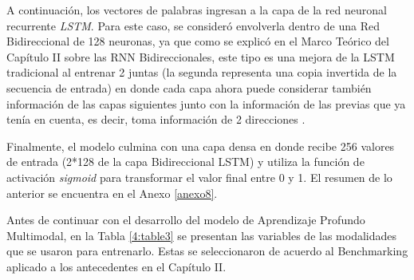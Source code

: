 A continuación, los vectores de palabras ingresan a la capa de la red neuronal recurrente \textit{LSTM}. Para este caso, se consideró envolverla dentro de una Red Bidireccional de 128 neuronas, ya que como se explicó en el Marco Teórico del Capítulo II sobre las RNN Bidireccionales, este tipo es una mejora de la LSTM tradicional al entrenar 2 juntas (la segunda representa una copia invertida de la secuencia de entrada) en donde cada capa ahora puede considerar también información de las capas siguientes junto con la información de las previas que ya tenía en cuenta, es decir, toma información de 2 direcciones \parencite{tec_brownlee2017bidirectional_lstm}.

Finalmente, el modelo culmina con una capa densa en donde recibe 256 valores de entrada (2*128 de la capa Bidireccional LSTM) y utiliza la función de activación \textit{sigmoid} para transformar el valor final entre 0 y 1. El resumen de lo anterior se encuentra en el Anexo \ref{anexo8}.

Antes de continuar con el desarrollo del modelo de Aprendizaje Profundo Multimodal, en la Tabla \ref{4:table3} se presentan las variables de las modalidades que se usaron para entrenarlo. Estas se seleccionaron de acuerdo al Benchmarking aplicado a los antecedentes en el Capítulo II.

